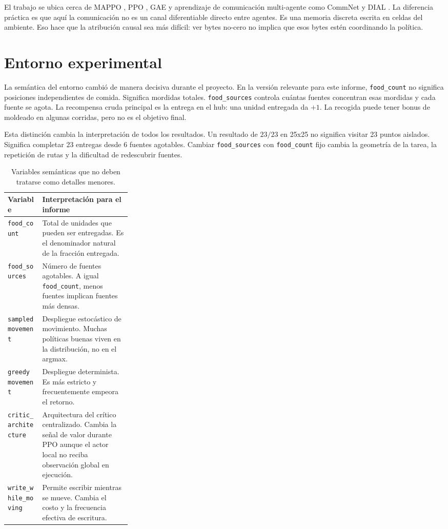 \documentclass[11pt,a4paper]{article}
\newcommand{\metric}[1]{\nolinkurl{#1}}
\begin{document}
El trabajo se ubica cerca de MAPPO \cite{yu2022mappo}, PPO \cite{schulman2017ppo}, GAE \cite{schulman2015gae} y aprendizaje de comunicación multi-agente como CommNet y DIAL \cite{sukhbaatar2016commnet,foerster2016dial}. La diferencia práctica es que aquí la comunicación no es un canal diferentiable directo entre agentes. Es una memoria discreta escrita en celdas del ambiente. Eso hace que la atribución causal sea más difícil: ver bytes no-cero no implica que esos bytes estén coordinando la política.

\section{Entorno experimental}

La semántica del entorno cambió de manera decisiva durante el proyecto. En la versión relevante para este informe, \metric{food_count} no significa posiciones independientes de comida. Significa mordidas totales. \metric{food_sources} controla cuántas fuentes concentran esas mordidas y cada fuente se agota. La recompensa cruda principal es la entrega en el hub: una unidad entregada da \(+1\). La recogida puede tener bonus de moldeado en algunas corridas, pero no es el objetivo final.

Esta distinción cambia la interpretación de todos los resultados. Un resultado de \(23/23\) en 25x25 no significa visitar 23 puntos aislados. Significa completar 23 entregas desde 6 fuentes agotables. Cambiar \metric{food_sources} con \metric{food_count} fijo cambia la geometría de la tarea, la repetición de rutas y la dificultad de redescubrir fuentes.

\begin{table}[h]
\centering
\caption{Variables semánticas que no deben tratarse como detalles menores.}
\begin{tabularx}{\linewidth}{>{\raggedright\arraybackslash}p{0.28\linewidth}X}
\toprule
Variable & Interpretación para el informe \\
\midrule
\metric{food_count} & Total de unidades que pueden ser entregadas. Es el denominador natural de la fracción entregada. \\
\metric{food_sources} & Número de fuentes agotables. A igual \metric{food_count}, menos fuentes implican fuentes más densas. \\
\metric{sampled movement} & Despliegue estocástico de movimiento. Muchas políticas buenas viven en la distribución, no en el argmax. \\
\metric{greedy movement} & Despliegue determinista. Es más estricto y frecuentemente empeora el retorno. \\
\metric{critic_architecture} & Arquitectura del crítico centralizado. Cambia la señal de valor durante PPO aunque el actor local no reciba observación global en ejecución. \\
\metric{write_while_moving} & Permite escribir mientras se mueve. Cambia el costo y la frecuencia efectiva de escritura. \\
\bottomrule
\end{tabularx}
\end{table}
\end{document}
